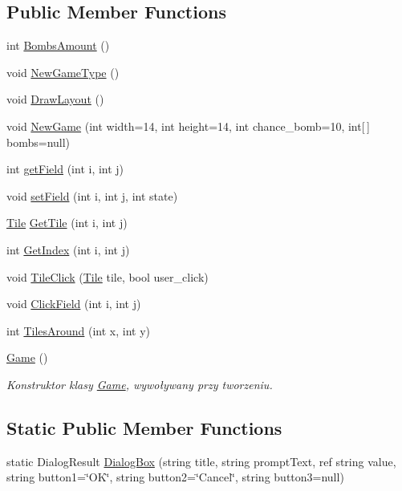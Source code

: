 \subsection*{Public Member Functions}
\begin{DoxyCompactItemize}
\item 
int \mbox{\hyperlink{class_saper_1_1_game_a68a874323b134ee545e72de1d332f11a}{Bombs\+Amount}} ()
\item 
void \mbox{\hyperlink{class_saper_1_1_game_a1f14c9d69d6267494ca48f146c9e34c7}{New\+Game\+Type}} ()
\item 
void \mbox{\hyperlink{class_saper_1_1_game_ae9bce8a78f549e7e728c6b1f290c9d7e}{Draw\+Layout}} ()
\item 
void \mbox{\hyperlink{class_saper_1_1_game_a77b5cf2c44e21908cbbe17622ef1c2db}{New\+Game}} (int width=14, int height=14, int chance\+\_\+bomb=10, int\mbox{[}$\,$\mbox{]} bombs=null)
\item 
int \mbox{\hyperlink{class_saper_1_1_game_a6ad3e962eca53c2dbf6b499a469fa5f2}{get\+Field}} (int i, int j)
\item 
void \mbox{\hyperlink{class_saper_1_1_game_aa62b5814c25458101aaf843271dcff83}{set\+Field}} (int i, int j, int state)
\item 
\mbox{\hyperlink{class_saper_1_1_tile}{Tile}} \mbox{\hyperlink{class_saper_1_1_game_aad59b3c8d1d9ca582a9b508aad99631a}{Get\+Tile}} (int i, int j)
\item 
int \mbox{\hyperlink{class_saper_1_1_game_a036a73f7d4b60dada7ec45c9a712eff4}{Get\+Index}} (int i, int j)
\item 
void \mbox{\hyperlink{class_saper_1_1_game_ad7088e52259cb63a068213bf2856eebb}{Tile\+Click}} (\mbox{\hyperlink{class_saper_1_1_tile}{Tile}} tile, bool user\+\_\+click)
\item 
void \mbox{\hyperlink{class_saper_1_1_game_a87c8f7562e380781913a182aab6e093d}{Click\+Field}} (int i, int j)
\item 
int \mbox{\hyperlink{class_saper_1_1_game_a77640c9261a148c9e68f28b0b02b57c8}{Tiles\+Around}} (int x, int y)
\item 
\mbox{\hyperlink{class_saper_1_1_game_a9d694a044fb311e088ce585b716a9d84}{Game}} ()
\begin{DoxyCompactList}\small\item\em Konstruktor klasy \mbox{\hyperlink{class_saper_1_1_game}{Game}}, wywoływany przy tworzeniu. \end{DoxyCompactList}\end{DoxyCompactItemize}
\subsection*{Static Public Member Functions}
\begin{DoxyCompactItemize}
\item 
static Dialog\+Result \mbox{\hyperlink{class_saper_1_1_game_a807f8f51c7b6f8b63382b7eb098b5fab}{Dialog\+Box}} (string title, string prompt\+Text, ref string value, string button1=\char`\"{}OK\char`\"{}, string button2=\char`\"{}Cancel\char`\"{}, string button3=null)
\end{DoxyCompactItemize}

